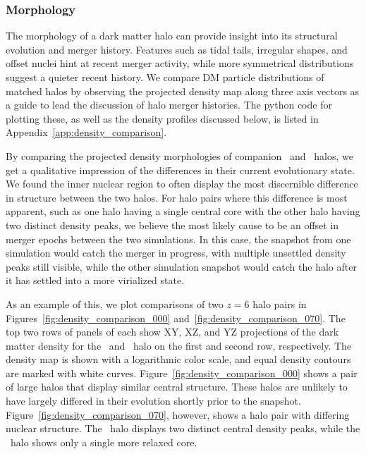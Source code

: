 \subsubsection{Morphology}
\label{subsubsec:analysis--halo_comparison--morphology}


The morphology of a dark matter halo can provide insight into its structural evolution and merger history.  Features such as tidal tails, irregular shapes, and offset nuclei hint at recent merger activity, while more symmetrical distributions suggest a quieter recent history.  We compare DM particle distributions of matched halos by observing the projected density map along three axis vectors as a guide to lead the discussion of halo merger histories.  The python code for plotting these, as well as the density profiles discussed below, is listed in Appendix~\ref{app:density_comparison}.

By comparing the projected density morphologies of companion \lpt\ and \za\ halos, we get a qualitative impression of the differences in their current evolutionary state.  We found the inner nuclear region to often display the most discernible difference in structure between the two halos.  For halo pairs where this difference is most apparent, such as one halo having a single central core with the other halo having two distinct density peaks, we believe the most likely cause to be an offset in merger epochs between the two simulations.  In this case, the snapshot from one simulation would catch the merger in progress, with multiple unsettled density peaks still visible, while the other simulation snapshot would catch the halo after it has settled into a more virialized state.

As an example of this, we plot comparisons of two $z = 6$ halo pairs in Figures~\ref{fig:density_comparison_000} and~\ref{fig:density_comparison_070}.  The top two rows of panels of each show XY, XZ, and YZ projections of the dark matter density for the \lpt\ and \za\ halo on the first and second row, respectively.  The density map is shown with a logarithmic color scale, and equal density contours are marked with white curves.  Figure~\ref{fig:density_comparison_000} shows a pair of large halos that display similar central structure.  These halos are unlikely to have largely differed in their evolution shortly prior to the snapshot.  Figure~\ref{fig:density_comparison_070}, however, shows a halo pair with differing nuclear structure.  The \za\ halo displays two distinct central density peaks, while the \lpt\ halo shows only a single more relaxed core.

